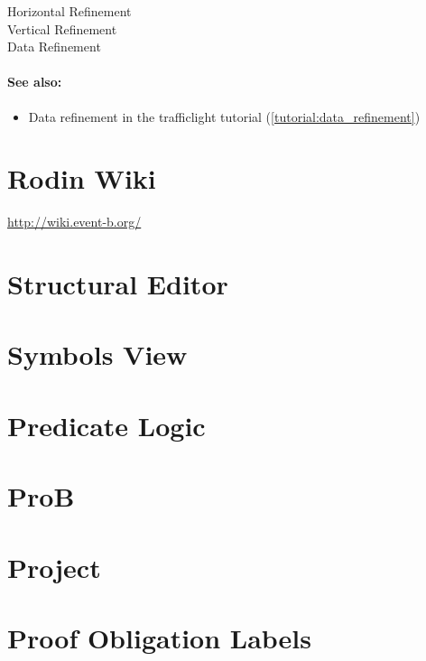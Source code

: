 \begin{description}
	\item[Horizontal Refinement]
	\item[Vertical Refinement]
	\item[Data Refinement]
\end{description}

\paragraph*{See also:}
\begin{itemize}
\item Data refinement in the trafficlight tutorial (\ref{tutorial:data_refinement})
\end{itemize}

\section{Rodin Wiki}
\label{rodin_wiki}

\url{http://wiki.event-b.org/}

\section{Structural Editor}
\label{structural_editor}

\section{Symbols View}
\label{symbols_view}

\section{Predicate Logic}
\label{predicate_logic}

\section{ProB}
\label{prob}

\section{Project}
\label{project}

\section{Proof Obligation Labels}
\label{po_labels}

